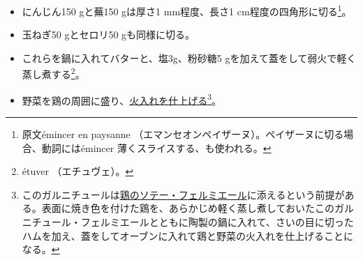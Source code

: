 \begin{recette}
\begin{itemize}
\item
  にんじん150 gと蕪150 gは厚さ1 mm程度、長さ1
  cm程度の四角形に切る\footnote{原文émincer en paysanne
    （エマンセオンペイザーヌ）。ペイザーヌに切る場合、動詞にはémincer
    薄くスライスする、も使われる。}。
\item
  玉ねぎ50 gとセロリ50 gも同様に切る。
\item
  これらを鍋に入れてバターと、塩3g、粉砂糖5
  gを加えて蓋をして弱火で軽く蒸し煮する\footnote{étuver （エチュヴェ）。}。
\item
  野菜を鶏の周囲に盛り、\ul{火入れを仕上げる}\footnote{このガルニチュールは\protect\hyperlink{poulet-saute-a-la-fermiere}{鶏のソテー・フェルミエール}に添えるという前提がある。表面に焼き色を付けた鶏を、あらかじめ軽く蒸し煮しておいたこのガルニチュール・フェルミエールとともに陶製の鍋に入れて、さいの目に切ったハムを加え、蓋をしてオーブンに入れて鶏と野菜の火入れを仕上げることになる。}。
\end{itemize}

\atoaki{}

\hypertarget{garniture-a-la-financiere}{%
}
\end{recette}

